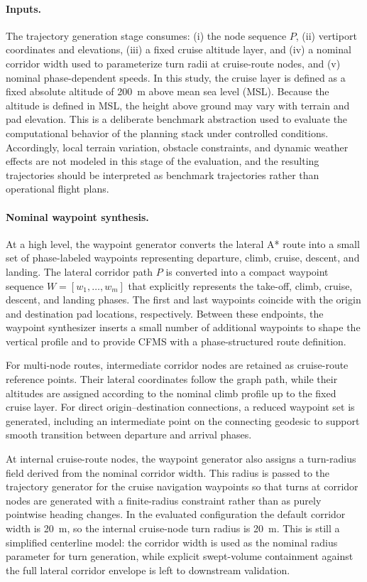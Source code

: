 \paragraph{Inputs.}
The trajectory generation stage consumes:
(i) the node sequence \(P\),
(ii) vertiport coordinates and elevations,
(iii) a fixed cruise altitude layer, and
(iv) a nominal corridor width used to parameterize turn radii at cruise-route nodes, and
(v) nominal phase-dependent speeds.
In this study, the cruise layer is defined as a fixed absolute altitude of \SI{200}{m} above mean sea level (MSL). Because the altitude is defined in MSL, the height above ground may vary with terrain and pad elevation. This is a deliberate benchmark abstraction used to evaluate the computational behavior of the planning stack under controlled conditions. Accordingly, local terrain variation, obstacle constraints, and dynamic weather effects are not modeled in this stage of the evaluation, and the resulting trajectories should be interpreted as benchmark trajectories rather than operational flight plans.

\paragraph{Nominal waypoint synthesis.}
At a high level, the waypoint generator converts the lateral A* route into a small set of phase-labeled waypoints representing departure, climb, cruise, descent, and landing. The lateral corridor path \(P\) is converted into a compact waypoint sequence \(W=[w_1,\dots,w_m]\) that explicitly represents the take-off, climb, cruise, descent, and landing phases. The first and last waypoints coincide with the origin and destination pad locations, respectively. Between these endpoints, the waypoint synthesizer inserts a small number of additional waypoints to shape the vertical profile and to provide CFMS with a phase-structured route definition.

For multi-node routes, intermediate corridor nodes are retained as cruise-route reference points. Their lateral coordinates follow the graph path, while their altitudes are assigned according to the nominal climb profile up to the fixed cruise layer. For direct origin--destination connections, a reduced waypoint set is generated, including an intermediate point on the connecting geodesic to support smooth transition between departure and arrival phases.

At internal cruise-route nodes, the waypoint generator also assigns a turn-radius field derived from the nominal corridor width. This radius is passed to the trajectory generator for the cruise navigation waypoints so that turns at corridor nodes are generated with a finite-radius constraint rather than as purely pointwise heading changes. In the evaluated configuration the default corridor width is \SI{20}{m}, so the internal cruise-node turn radius is \SI{20}{m}. This is still a simplified centerline model: the corridor width is used as the nominal radius parameter for turn generation, while explicit swept-volume containment against the full lateral corridor envelope is left to downstream validation.

